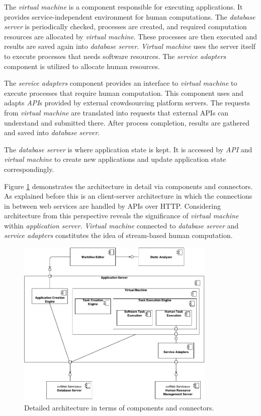 The \textit{virtual machine} is a component responsible for executing applications. 
It provides service-independent environment for human computations. The 
\textit{database server} is periodically checked, processes are created, and 
required computation resources are allocated by \textit{virtual machine}. These 
processes are then executed and results are saved again into \textit{database server}. 
\textit{Virtual machine} uses the server itself to execute processes that needs 
software resources. The \textit{service adapters} component is utilized to allocate 
human resources.

The \textit{service adapters} component provides an interface to \textit{virtual machine} 
to execute processes that require human computation. This component uses and 
adapts \textit{API}s provided by external crowdsourcing platform servers. The requests 
from \textit{virtual machine} are translated into requests that external APIs can 
understand and submitted there. After process completion, results are gathered and 
saved into \textit{database server}.

The \textit{database server} is where application state is kept. It is accessed by 
\textit{API} and \textit{virtual machine} to create new applications and update 
application state correspondingly.

Figure \ref{fig:componentconnector} demonstrates the architecture in detail 
via components and connectors. As explained before this is an client-server 
architecture in which the connections in between web services are handled 
by APIs over HTTP. Considering architecture from this perspective reveals the 
significance of \textit{virtual machine} within \textit{application server}. 
\textit{Virtual machine} connected to \textit{database server} and 
\textit{service adapters} constitutes the idea of stream-based human computation.

\begin{figure}[ht]
	\centering
	\includegraphics[width=0.85\textwidth]{figures/architecture/ComponentConnector.pdf}
	\caption{Detailed architecture in terms of components and connectors.}
	\label{fig:componentconnector}
\end{figure}

